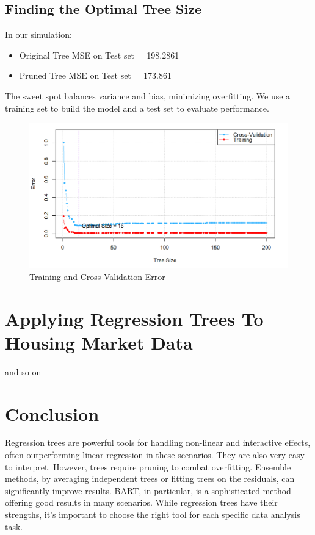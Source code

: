 \documentclass[12pt]{article}
\begin{document}
\subsection{Finding the Optimal Tree Size}
In our simulation:
\begin{itemize}
    \item Original Tree MSE on Test set = 198.2861 
    \item Pruned Tree MSE on Test set = 173.861 
\end{itemize}


The sweet spot balances variance and bias, minimizing overfitting. We use a training set to build the model and a test set to evaluate performance.


\begin{figure}
    \centering
    \includegraphics[scale=0.50]{Pruning.png}
    \caption{Training and Cross-Validation Error}
    \label{fig:sub4}  %
\end{figure}




\section{Applying Regression Trees To Housing Market Data}


and so on






 \section{Conclusion}
Regression trees are powerful tools for handling non-linear and interactive effects, often outperforming linear regression in these scenarios. They are also very easy to interpret. However, trees require pruning to combat overfitting. Ensemble methods, by averaging independent trees or fitting trees on the residuals, can significantly improve results. BART, in particular, is a sophisticated method offering good results in many scenarios. While regression trees have their strengths, it's important to choose the right tool for each specific data analysis task.
\end{document}
